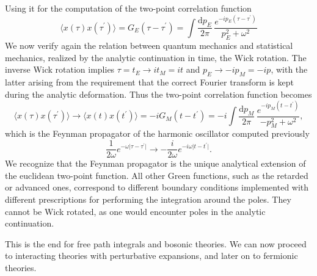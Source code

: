 Using it for the computation of the two-point correlation function
\[
    \langle x(\tau) x(\tau^{\prime}) \rangle = G_E(\tau - \tau^{\prime}) = \int \frac{\mathrm{d}p_E}{2\pi} \, \frac{e^{-ip_E(\tau - \tau^{\prime})}}{p_E^2 + \omega^2}
\]
We now verify again the relation between quantum mechanics and statistical mechanics, realized by the analytic continuation in time, the Wick rotation. The inverse Wick rotation implies \(\tau = t_E \to i t_M = it\) and \(p_E \to -ip_M = -ip\), with the latter arising from the requirement that the correct Fourier transform is kept during the analytic deformation. Thus the two-point correlation function becomes
\[
    \langle x(\tau) x(\tau^{\prime}) \rangle \to \langle x(t) x(t^{\prime}) \rangle = -i G_M (t-t^{\prime}) = -i \int \frac{\mathrm{d}p_M}{2\pi} \, \frac{e^{-ip_M(t-t^{\prime})}}{-p_M^2 + \omega^2},
\]
which is the Feynman propagator of the harmonic oscillator computed previously
\[
    \frac{1}{2 \omega} e^{-\omega \vert \tau - \tau^{\prime} \vert} \to -\frac{i}{2\omega} e^{-i\omega \vert t - t^{\prime} \vert}.
\]
We recognize that the Feynman propagator is the unique analytical extension of the euclidean two-point function. All other Green functions, such as the retarded or advanced ones, correspond to different boundary conditions implemented with different prescriptions for performing the integration around the poles. They cannot be Wick rotated, as one would encounter poles in the analytic continuation.

This is the end for free path integrals and bosonic theories. We can now proceed to interacting theories with perturbative expansions, and later on to fermionic theories.
